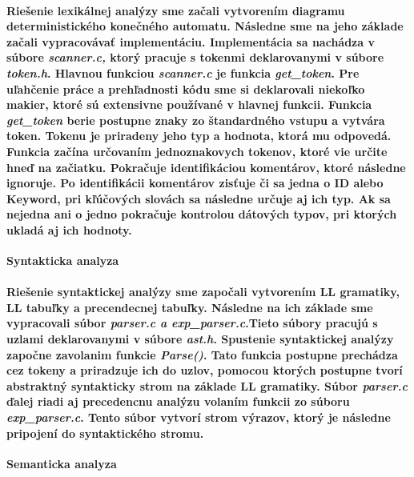 \documentclass[12pt]{article}
\begin{document}
\paragraph{\indent Riešenie lexikálnej analýzy sme začali vytvorením diagramu deterministického konečného automatu. Následne sme na jeho základe začali vypracovávať implementáciu. Implementácia sa nachádza v súbore \textit{scanner.c,} ktorý pracuje s tokenmi deklarovanymi v súbore \textit{token.h}. Hlavnou funkciou \textit{scanner.c} je funkcia \textit{get\_token}. Pre uľahčenie práce a prehľadnosti kódu sme si deklarovali niekoľko makier, ktoré sú extensivne používané v hlavnej funkcii. Funkcia \textit{get\_token} berie postupne znaky zo štandardného vstupu a vytvára token. Tokenu je priradeny jeho typ a hodnota, ktorá mu odpovedá. Funkcia začína určovaním jednoznakovych tokenov, ktoré vie určite hneď na začiatku. Pokračuje identifikáciou komentárov, ktoré následne ignoruje. Po identifikácii komentárov zisťuje či sa jedna o ID alebo Keyword, pri kľúčových slovách sa následne určuje aj ich typ. Ak sa nejedna ani o jedno pokračuje kontrolou dátových typov, pri ktorých ukladá aj ich hodnoty.  \newline \\}

 \Large \textbf{Syntakticka analyza}\normalsize \\
\noindent\makebox[\linewidth]{\rule{\textwidth}{0.4pt}}

\paragraph{Riešenie syntaktickej analýzy sme započali vytvorením LL gramatiky, LL tabuľky a precendecnej tabuľky. Následne na ich základe sme vypracovali súbor \textit{parser.c a exp\_parser.c}.Tieto súbory pracujú s uzlami deklarovanymi v súbore \textit{ast.h}. Spustenie syntaktickej analýzy započne zavolanim funkcie \textit{Parse()}. Tato funkcia postupne prechádza cez tokeny a priradzuje ich do uzlov, pomocou ktorých postupne tvorí abstraktný syntakticky strom na základe LL gramatiky. Súbor \textit{parser.c} ďalej riadi aj precedencnu analýzu volaním funkcii zo súboru \textit{exp\_parser.c}. Tento súbor vytvorí strom výrazov, ktorý je následne pripojení do syntaktického stromu.  \newline \\}

 \Large \textbf{Semanticka analyza}\normalsize \\
\noindent\makebox[\linewidth]{\rule{\textwidth}{0.4pt}}
\end{document}
